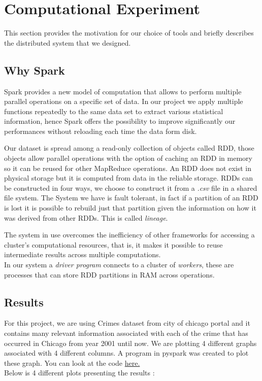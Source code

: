 \section{Computational Experiment}


This section provides the motivation for our choice of tools and briefly describes the distributed system that we designed. 

\subsection{Why Spark}
Spark provides a new model of computation that allows to perform multiple parallel operations on a specific set of data. In our project we apply multiple functions repeatedly to the same data set to extract various statistical information, hence Spark offers the possibility to improve significantly our performances without reloading each time the data form disk\cite{Sparkzaharia}.

Our dataset is spread among a read-only collection of objects called RDD, those objects allow parallel operations with the option of caching an RDD in memory so it can be reused for other MapReduce operations. An RDD does not exist in physical storage but it is computed from data in the reliable storage. 
RDDs can be constructed in four ways, we choose to construct it from a \textit{.csv} file in a shared file system. The System we have is fault tolerant, in fact if a partition of an RDD is lost it is possible to rebuild just that partition given the information on how it was derived from other RDDs. This is called \textit{lineage}\cite{Sparkzaharia}.

The system in use overcomes the inefficiency of other frameworks for accessing a cluster's computational resources, that is, it makes it possible to reuse intermediate results across multiple computations\cite{RDD}. \\
In our system a \textit{driver program} connects to a cluster of \textit{workers}, these are processes that can store RDD partitions in RAM across operations\cite{RDD}. 

\subsection{Results}
For this project, we are using Crimes dataset\cite{cityOfChicago} from city of chicago portal and it contains many relevant information associated with each of the crime that has occurred in Chicago from year 2001 until now. We are plotting 4 different graphs associated with 4 different columns. A program in pyspark was created to plot these graph. You can look at the code \href{https://github.com/ankurshukla03/ldsaproject/blob/edit_report/code/Crimes.ipynb}{here.} \\
Below is 4 different plots presenting the results :\\

